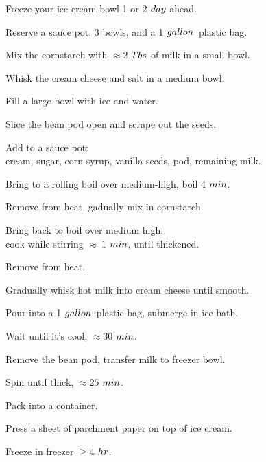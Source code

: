 \begin{preparation}
\item Freeze your ice cream bowl 1 or 2 $\Day$ ahead.
\item Reserve a sauce pot, 3 bowls, and a 1 $\gallon$~plastic bag.
\item Mix the cornstarch with $\approx 2$ $\Tablespoon$ of milk in a small bowl.
\item Whisk the cream cheese and salt in a medium bowl.
\item Fill a large bowl with ice and water.
\item Slice the bean pod open and scrape out the seeds.
\item Add to a sauce pot:\\cream, sugar, corn syrup, vanilla seeds, pod, remaining milk.
\item Bring to a rolling boil over medium-high, boil 4 $\minute$.
\item Remove from heat, gadually mix in cornstarch.
\item Bring back to boil over medium high,\\cook while stirring $\approx~1$ $\minute$, until thickened.
\item Remove from heat.
\item Gradually whisk hot milk into cream cheese until smooth.
\item Pour into a 1 $\gallon$~plastic bag, submerge in ice bath.
\item Wait until it's cool, $\approx 30$ $\minute$.
\item Remove the bean pod, transfer milk to freezer bowl.
\item Spin until thick, $\approx 25$ $\minute$.
\item Pack into a container.
\item Press a sheet of parchment paper on top of ice cream.
\item Freeze in freezer $\ge4$ $\hour$.
\end{preparation}

\recipeend%
